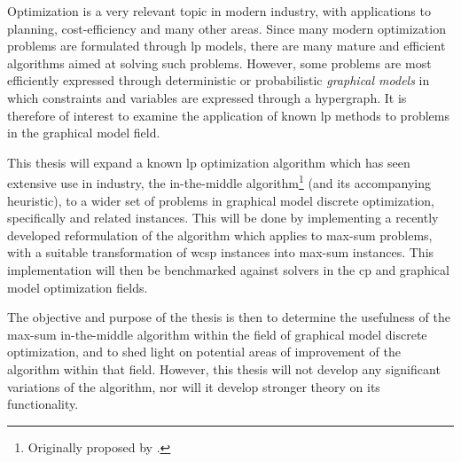 Optimization is a very relevant topic in modern industry, with applications to planning, cost-efficiency and many other areas.
Since many modern optimization problems are formulated through \acrlong{lp} models, there are many mature and efficient algorithms aimed at solving such problems.
However, some problems are most efficiently expressed through deterministic or probabilistic \emph{graphical models} in which constraints and variables are expressed through a hypergraph.
It is therefore of interest to examine the application of known \acrlong{lp} methods to problems in the graphical model field.

This thesis will expand a known \acrlong{lp} optimization algorithm which has seen extensive use in industry, the in-the-middle algorithm\footnote{Originally proposed by \textcite{Wedelin95}.} (and its accompanying heuristic), to a wider set of problems in graphical model discrete optimization, specifically  and related instances.
This will be done by implementing a recently developed reformulation of the algorithm which applies to max-sum problems, with a suitable transformation of \acrlong{wcsp} instances into max-sum instances.
This implementation will then be benchmarked against solvers in the \acrlong{cp} and graphical model optimization fields.

The objective and purpose of the thesis is then to determine the usefulness of the max-sum in-the-middle algorithm within the field of graphical model discrete optimization, and to shed light on potential areas of improvement of the algorithm within that field.
However, this thesis will not develop any significant variations of the algorithm, nor will it develop stronger theory on its functionality.
